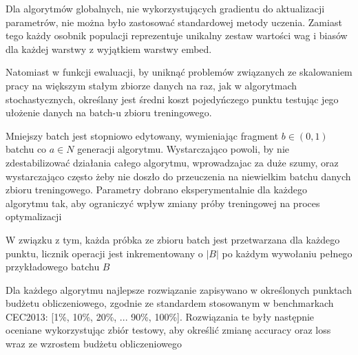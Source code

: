 Dla algorytmów globalnych, nie wykorzystujących gradientu do aktualizacji parametrów, nie można było zastosować standardowej metody uczenia. Zamiast tego każdy osobnik populacji reprezentuje unikalny zestaw wartości wag i biasów dla każdej warstwy z wyjątkiem warstwy embed.

Natomiast w funkcji ewaluacji, by uniknąć problemów związanych ze skalowaniem pracy na większym stałym zbiorze danych na raz, jak w algorytmach stochastycznych, określany jest średni koszt pojedyńczego punktu testując jego ułożenie danych na batch-u zbioru treningowego. 

Mniejszy batch jest stopniowo edytowany, wymieniając fragment $b \in (0, 1)$ batchu co $a \in N$ generacji algorytmu. Wystarczająco powoli, by nie zdestabilizować działania całego algorytmu, wprowadzajac za duże szumy, oraz wystarczająco często żeby nie doszło do przeuczenia na niewielkim batchu danych zbioru treningowego. Parametry dobrano eksperymentalnie dla każdego algorytmu tak, aby ograniczyć wpływ zmiany próby treningowej na proces optymalizacji

W związku z tym, każda próbka ze zbioru batch jest przetwarzana dla każdego punktu, licznik operacji jest inkrementowany o $|B|$ po każdym wywołaniu pełnego przykładowego batchu $B$

Dla każdego algorytmu najlepsze rozwiązanie zapisywano w określonych punktach budżetu obliczeniowego, zgodnie ze standardem stosowanym w benchmarkach CEC2013: [1\%, 10\%, 20\%, ... 90\%, 100\%]. Rozwiązania te były następnie oceniane wykorzystując zbiór testowy, aby określić zmianę accuracy oraz loss wraz ze wzrostem budżetu obliczeniowego

